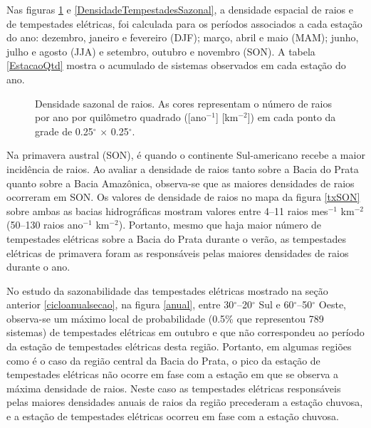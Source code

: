 Nas figuras \ref{densidadeSazonalRaios} e \ref{DensidadeTempestadesSazonal}, a densidade espacial de raios e de tempestades elétricas, foi calculada para os períodos associados a cada estação do ano: dezembro, janeiro e fevereiro (DJF); março, abril e maio (MAM); junho, julho e agosto (JJA) e setembro, outubro e novembro (SON). A tabela \ref{EstacaoQtd} mostra o acumulado de sistemas observados em cada estação do ano.


\begin{figure}[!ht]
  \caption{Densidade sazonal de raios. As cores representam o número de raios por ano por quilômetro quadrado ([ano$^{-1}$] [km$^{-2}$]) em cada ponto da grade de 0.25$^{\circ}$ $\times$ 0.25$^{\circ}$. } 
\label{densidadeSazonalRaios}
\end{figure} 

Na primavera austral (SON), é quando o continente Sul-americano recebe a maior incidência de raios. Ao avaliar a densidade de raios tanto sobre a Bacia do Prata quanto sobre a Bacia Amazônica, observa-se que as maiores densidades de raios ocorreram em SON. Os valores de densidade de raios no mapa da figura \ref{txSON} sobre ambas as bacias hidrográficas  mostram valores entre 4--11 raios mes$^{-1}$ km$^{-2}$ (50--130 raios ano$^{-1}$ km$^{-2}$). Portanto, mesmo que haja maior número de tempestades elétricas sobre a Bacia do Prata durante o verão, as tempestades elétricas de primavera foram as responsáveis pelas maiores densidades de raios durante o ano.

No estudo da sazonabilidade das tempestades elétricas mostrado na seção anterior \ref{cicloanualsecao}, na figura \ref{anual}, entre 30$^{\circ}$--20$^{\circ}$ Sul e 60$^{\circ}$--50$^{\circ}$ Oeste, observa-se um máximo local de probabilidade (0.5\% que representou 789 sistemas) de tempestades elétricas em outubro e que não correspondeu ao período da estação de tempestades elétricas desta região. Portanto, em algumas regiões como é o caso da região central da Bacia do Prata,  o pico da estação de tempestades elétricas não ocorre em fase com a estação em que se observa a máxima densidade de raios. Neste caso as tempestades elétricas responsáveis pelas maiores densidades anuais de raios da região precederam a estação chuvosa, e a estação de tempestades elétricas ocorreu em fase com a estação chuvosa.




